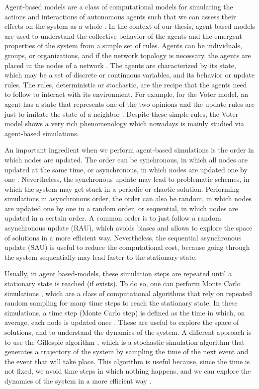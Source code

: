 Agent-based models are a class of computational models for simulating the actions and interactions of autonomous agents such that we can assess their effects on the system as a whole \cite{duffy-1998, bonabeau-2002}. In the context of our thesis, agent based models are used to understand the collective behavior of the agents and the emergent properties of the system from a simple set of rules. Agents can be individuals, groups, or organizations, and if the network topology is necessary, the agents are placed in the nodes of a network \cite{macal-2010, railsback-2011}. The agents are characterized by its state, which may be a set of  discrete or continuous variables, and its behavior or update rules. The rules, deterministic or stochastic, are the recipe that the agents need to follow to interact with its environment. For example, for the Voter model, an agent has a state that represents one of the two opinions and the update rules are just to imitate the state of a neighbor \cite{castellano2009statistical}. Despite these simple rules, the Voter model shows a very rich phenomenology which nowadays is mainly studied via agent-based simulations.

An important ingredient when we perform agent-based simulations is the order in which nodes are updated. The order can be synchronous, in which all nodes are updated at the same time, or asynchronous, in which nodes are updated one by one \cite{macal-2010, railsback-2011}. Nevertheless, the synchronous update may lead to problematic schemes, in which the system may get stuck in a periodic or chaotic solution. Performing simulations in asynchronous order, the order can also be random, in which nodes are updated one by one in a random order, or sequential, in which nodes are updated in a certain order. A common order is to just follow a random asynchronous update (RAU), which avoids biases and allows to explore the space of solutions in a more efficient way. Nevertheless, the sequential asynchronous update (SAU) is useful to reduce the computational cost, because going through the system sequentially may lead faster to the stationary state.

Usually, in agent based-models, these simulation steps are repeated until a stationary state is reached (if exists). To do so, one can perform Monte Carlo simulations \cite{metropolis-1949,cronin2006monte}, which are a class of computational algorithms that rely on repeated random sampling for many time steps to reach the stationary state. In these simulations, a time step (Monte Carlo step) is defined as the time in which, on average, each node is updated once \cite{newman-1999, landau-2014}. These are useful to explore the space of solutions, and to understand the dynamics of the system. A different approach is to use the Gillespie algorithm \cite{gillespie-1977}, which is a stochastic simulation algorithm that generates a trajectory of the system by sampling the time of the next event and the event that will take place. This algorithm is useful because, since the time is not fixed, we avoid time steps in which nothing happens, and we can explore the dynamics of the system in a more efficient way \cite{gibson-2000}.

